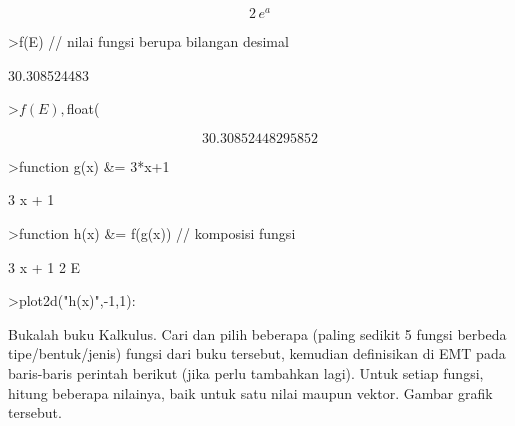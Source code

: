 \documentclass{article}
\begin{document}
\begin{eulernotebook}
\begin{eulercomment}
\begin{eulercomment}
\begin{euleroutput}
\end{euleroutput}
\begin{eulerformula}
\[
2\,e^{a}
\]
\end{eulerformula}
\begin{eulerprompt}
>f(E) // nilai fungsi berupa bilangan desimal
\end{eulerprompt}
\begin{euleroutput}
  30.308524483
\end{euleroutput}
\begin{eulerprompt}
>$f(E), $float(%
\end{eulerprompt}
\begin{eulerformula}
\[
30.30852448295852
\]
\end{eulerformula}
\begin{eulerprompt}
>function g(x) &= 3*x+1
\end{eulerprompt}
\begin{euleroutput}
  
                                 3 x + 1
  
\end{euleroutput}
\begin{eulerprompt}
>function h(x) &= f(g(x)) // komposisi fungsi
\end{eulerprompt}
\begin{euleroutput}
  
                                   3 x + 1
                                2 E
  
\end{euleroutput}
\begin{eulerprompt}
>plot2d("h(x)",-1,1):
\end{eulerprompt}
\begin{eulercomment}
Bukalah buku Kalkulus. Cari dan pilih beberapa (paling sedikit 5
fungsi berbeda tipe/bentuk/jenis) fungsi dari buku tersebut, kemudian
definisikan di EMT pada baris-baris perintah berikut (jika perlu
tambahkan lagi). Untuk setiap fungsi, hitung beberapa nilainya, baik
untuk satu nilai maupun vektor. Gambar grafik tersebut.


\end{eulercomment}
\end{eulercomment}
\end{eulercomment}
\end{eulernotebook}
\end{document}
